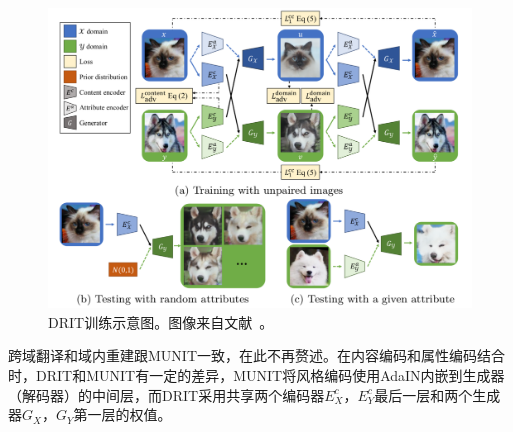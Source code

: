 \begin{figure}[ht]
    \centering
	\includegraphics[width=\textwidth]{figures/DRIT.pdf}
	\caption{DRIT训练示意图。图像来自文献~\cite{lee2018diverse}。}
	\label{fig:drit}
\end{figure}

跨域翻译和域内重建跟MUNIT一致，在此不再赘述。在内容编码和属性编码结合时，DRIT和MUNIT有一定的差异，MUNIT将风格编码使用AdaIN内嵌到生成器（解码器）的中间层，而DRIT采用共享两个编码器$E_X^c$，$E_Y^c$最后一层和两个生成器$G_X$，$G_Y$第一层的权值。




